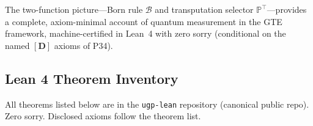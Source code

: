 \documentclass[11pt]{article}
\theoremstyle{remark}
\newcommand{\lean}[1]{%
  \penalty-100
  \begingroup\def\_{\textunderscore\allowbreak}\texttt{#1}\endgroup}
\begin{document}
The two-function picture---Born rule $\mathcal{B}$ and transputation selector
$\mathbb{P}^\top$---provides a complete, axiom-minimal account of quantum
measurement in the GTE framework, machine-certified in Lean~4 with zero sorry
(conditional on the named $[\mathbf{D}]$ axioms of P34).

\begin{appendices}

\section{Lean 4 Theorem Inventory}
\label{app:lean}

All theorems listed below are in the \lean{ugp-lean} repository
(canonical public repo).  Zero sorry.  Disclosed axioms follow the
theorem list.


\end{appendices}
\end{document}
